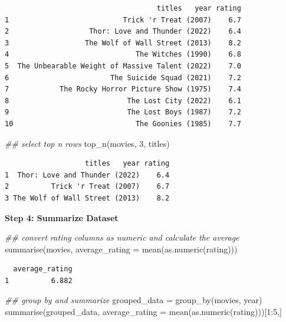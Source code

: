 \documentclass[
  letterpaper,
  DIV=11,
  numbers=noendperiod]{scrreprt}
\newenvironment{Shaded}{\begin{snugshade}}{\end{snugshade}}
\newcommand{\AttributeTok}[1]{\textcolor[rgb]{0.40,0.45,0.13}{#1}}
\newcommand{\DecValTok}[1]{\textcolor[rgb]{0.68,0.00,0.00}{#1}}
\newcommand{\DocumentationTok}[1]{\textcolor[rgb]{0.37,0.37,0.37}{\textit{#1}}}
\newcommand{\FunctionTok}[1]{\textcolor[rgb]{0.28,0.35,0.67}{#1}}
\newcommand{\NormalTok}[1]{\textcolor[rgb]{0.00,0.23,0.31}{#1}}
\newcommand{\OtherTok}[1]{\textcolor[rgb]{0.00,0.23,0.31}{#1}}
\newcommand{\SpecialCharTok}[1]{\textcolor[rgb]{0.37,0.37,0.37}{#1}}
\begin{document}
\begin{verbatim}
                                    titles   year rating
1                           Trick 'r Treat (2007)    6.7
2                   Thor: Love and Thunder (2022)    6.4
3                  The Wolf of Wall Street (2013)    8.2
4                              The Witches (1990)    6.8
5  The Unbearable Weight of Massive Talent (2022)    7.0
6                        The Suicide Squad (2021)    7.2
7            The Rocky Horror Picture Show (1975)    7.4
8                            The Lost City (2022)    6.1
9                            The Lost Boys (1987)    7.2
10                             The Goonies (1985)    7.7
\end{verbatim}

\begin{Shaded}
\begin{Highlighting}[]
\DocumentationTok{\#\# select top n rows}
\FunctionTok{top\_n}\NormalTok{(movies, }\DecValTok{3}\NormalTok{, titles)}
\end{Highlighting}
\end{Shaded}

\begin{verbatim}
                   titles   year rating
1  Thor: Love and Thunder (2022)    6.4
2          Trick 'r Treat (2007)    6.7
3 The Wolf of Wall Street (2013)    8.2
\end{verbatim}

\textbf{Step 4: Summarize Dataset}

\begin{Shaded}
\begin{Highlighting}[]
\DocumentationTok{\#\# convert rating columns as numeric and calculate the average}
\FunctionTok{summarise}\NormalTok{(movies, }\AttributeTok{average\_rating =} \FunctionTok{mean}\NormalTok{(}\FunctionTok{as.numeric}\NormalTok{(rating)))}
\end{Highlighting}
\end{Shaded}

\begin{verbatim}
  average_rating
1          6.882
\end{verbatim}

\begin{Shaded}
\begin{Highlighting}[]
\DocumentationTok{\#\# group by and summarize}
\NormalTok{grouped\_data }\OtherTok{=} \FunctionTok{group\_by}\NormalTok{(movies, year)}
\FunctionTok{summarise}\NormalTok{(grouped\_data, }\AttributeTok{average\_rating =} \FunctionTok{mean}\NormalTok{(}\FunctionTok{as.numeric}\NormalTok{(rating)))[}\DecValTok{1}\SpecialCharTok{:}\DecValTok{5}\NormalTok{,]}
\end{Highlighting}
\end{Shaded}
\end{document}
